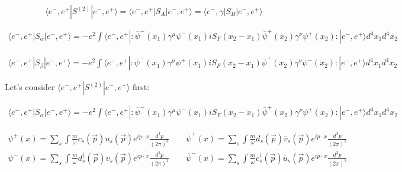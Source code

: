 \documentclass[a4]{article}
\begin{document}
        \begin{framed}
            \begin{equation}
                \langle e^{-}, e^{+} | S^{(2)} | e^{-}, e^{+}\rangle = \langle e^{-}, e^{+} | S_{A} | e^{-}, e^{+} \rangle = \langle e^{-}, \gamma | S_{B} | e^{-}, e^{+} \rangle
            \end{equation}

            \begin{equation}
                \begin{aligned}
                    \langle e^{-}, e^{+} | S_{\alpha} | e^{-}, e^{+} \rangle = - e^{2} \int \langle e^{-}, e^{+} |:\overline{\psi}^{-} (x_1) \gamma^{\mu} \psi^{-} (x_1) i S_{F} (x_2 - x_1) \overline{\psi}^{+} (x_2) \gamma^{\nu} \psi^{+} (x_2):| e^{-}, e^{+} \rangle d^{4} x_{1} d^{4} x_{2}
                \end{aligned}
            \end{equation}

            \begin{equation}
                \begin{aligned}
                    \langle e^{-}, e^{+} | S_{\beta} | e^{-}, e^{+} \rangle = - e^{2} \int \langle e^{-}, e^{+} |:\overline{\psi}^{-} (x_1) \gamma^{\mu} \psi^{+} (x_1) i S_{F} (x_2 - x_1) \overline{\psi}^{+} (x_2) \gamma^{\nu} \psi^{-} (x_2):| e^{-}, e^{+} \rangle d^{4} x_{1} d^{4} x_{2}
                \end{aligned}
            \end{equation}

            Let's consider $\langle e^{-}, e^{+} | S^{(2)} | e^{-}, e^{+}\rangle$ first:

            \begin{equation}
                \begin{aligned}
                    \langle e^{-}, e^{+} | S_{\alpha} | e^{-}, e^{+} \rangle = - e^{2} \int \langle e^{-}, e^{+} |:\overline{\psi}^{-} (x_1) \gamma^{\mu} \psi^{-} (x_1) i S_{F} (x_2 - x_1) \overline{\psi}^{+} (x_2) \gamma^{\nu} \psi^{+} (x_2):| e^{-}, e^{+} \rangle d^{4} x_{1} d^{4} x_{2}
                \end{aligned}
            \end{equation}

            \begin{equation}
                \begin{aligned}
                    \psi^{+} (x) = \sum_{s} \int \frac{m}{\omega} c_{s} (\vec{p}) u_{s} (\vec{p}) e^{i p \cdot x} \frac{d^3 p}{(2 \pi)^3} \qquad \overline{\psi}^{+} (x) = \sum_{s} \int \frac{m}{\omega} d_{s} (\vec{p}) \overline{v}_{s} (\vec{p}) e^{i p \cdot x} \frac{d^3 p}{(2 \pi)^3} \\
                    \psi^{-} (x) = \sum_{s} \int \frac{m}{\omega} d_{s}^{\dag} (\vec{p}) v_{s} (\vec{p}) e^{i p \cdot x} \frac{d^3 p}{(2 \pi)^3} \qquad \overline{\psi}^{-} (x) = \sum_{s} \int \frac{m}{\omega} c_{s}^{\dag} (\vec{p}) \overline{u}_{s} (\vec{p}) e^{i p \cdot x} \frac{d^3 p}{(2 \pi)^3}
                \end{aligned}
            \end{equation}


\end{framed}
\end{document}
